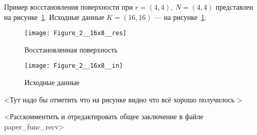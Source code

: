 

\label{sec:OCLprog}


Пример восстановления поверхности
при $r = (4,4),\ N = (4,4)$
представлен на рисунке~\ref{res_16_4}.
Исходные данные $K = (16,16)$ ---
на рисунке~\ref{res_16_4}.

\begin{figure}[h!]
  \centering
  \texttt{[image: Figure\_2\_\_16x8\_\_res]} 
  \caption{Восстановленная поверхность}
  \label{res_16_4}
\end{figure}
\FloatBarrier


\begin{figure}[h!]
  \centering
  \texttt{[image: Figure\_2\_\_16x8\_\_in]} 
  \caption{Исходные данные}
  \label{in_16_4}
\end{figure}
\FloatBarrier


<Тут надо бы отметить что на рисунке видно что всё хорошо получилось >

<Расскомментить и отредактировать общее заключение в файле paper_func_recv>




